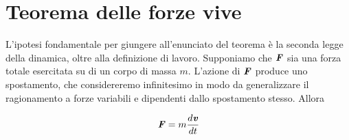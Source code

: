 






\section{Teorema delle forze vive}
L'ipotesi fondamentale per giungere all'enunciato del teorema
è la seconda legge della dinamica, oltre alla definizione di lavoro.
Supponiamo che $\textbf{\textit{F}}$ sia una forza totale esercitata su
di un corpo di massa $m$. L'azione di $\textbf{\textit{F}}$ produce uno
spostamento, che considereremo infinitesimo in modo da generalizzare
il ragionamento a forze variabili e dipendenti dallo spostamento
stesso. Allora

\[ \textbf{\textit{F}} = m\frac{d\textbf{\textit{v}}}{dt} \]

